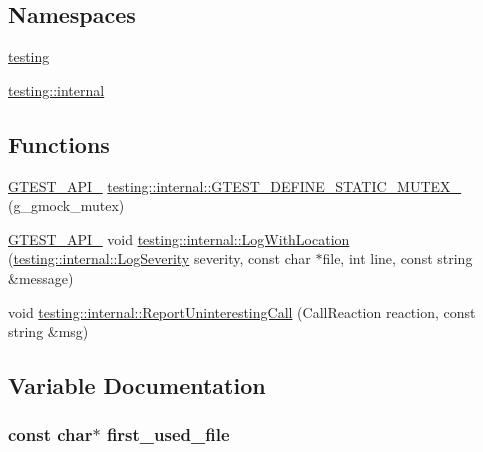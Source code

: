 \subsection*{Namespaces}
\begin{DoxyCompactItemize}
\item 
 \hyperlink{namespacetesting}{testing}
\item 
 \hyperlink{namespacetesting_1_1internal}{testing\+::internal}
\end{DoxyCompactItemize}
\subsection*{Functions}
\begin{DoxyCompactItemize}
\item 
\hyperlink{gtest-port_8h_aa73be6f0ba4a7456180a94904ce17790}{G\+T\+E\+S\+T\+\_\+\+A\+P\+I\+\_\+} \hyperlink{namespacetesting_1_1internal_a8c4aa7be8daa7b60e293071d70a89584}{testing\+::internal\+::\+G\+T\+E\+S\+T\+\_\+\+D\+E\+F\+I\+N\+E\+\_\+\+S\+T\+A\+T\+I\+C\+\_\+\+M\+U\+T\+E\+X\+\_\+} (g\+\_\+gmock\+\_\+mutex)
\item 
\hyperlink{gtest-port_8h_aa73be6f0ba4a7456180a94904ce17790}{G\+T\+E\+S\+T\+\_\+\+A\+P\+I\+\_\+} void \hyperlink{namespacetesting_1_1internal_af271cd1fc0b62a7f4736cb3109e86a37}{testing\+::internal\+::\+Log\+With\+Location} (\hyperlink{namespacetesting_1_1internal_a203d1a8a2147a53d12bbdae40d443914}{testing\+::internal\+::\+Log\+Severity} severity, const char $\ast$file, int line, const string \&message)
\item 
void \hyperlink{namespacetesting_1_1internal_a8d99a1e87d0cea563b2bfad8a4e65276}{testing\+::internal\+::\+Report\+Uninteresting\+Call} (Call\+Reaction reaction, const string \&msg)
\end{DoxyCompactItemize}


\subsection{Variable Documentation}
\subsubsection[{\texorpdfstring{first\+\_\+used\+\_\+file}{first_used_file}}]{\setlength{\rightskip}{0pt plus 5cm}const char$\ast$ first\+\_\+used\+\_\+file}\hypertarget{gmock-spec-builders_8cc_a8eedfa563d9488da77e2972262a6adda}{}\label{gmock-spec-builders_8cc_a8eedfa563d9488da77e2972262a6adda}
